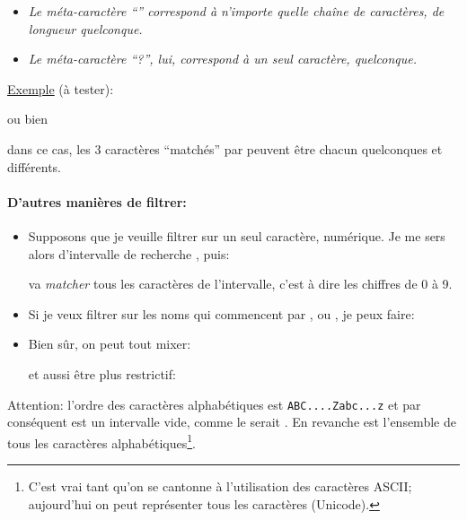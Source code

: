 \begin{center}
  \begin{boxedminipage}{0.75\linewidth}
    \begin{itemize}
    \item \emph{Le méta-caractère ``\ttt{*}'' correspond à n'importe quelle
  chaîne de caractères, de longueur quelconque.} 
    \item \emph{Le méta-caractère ``?'', lui, correspond à un
        seul caractère, quelconque.}
    \end{itemize}
\end{boxedminipage}
\end{center}


\underline{Exemple} (à tester):



ou bien


dans ce cas, les 3 caractères ``matchés'' par  peuvent être
chacun quelconques et différents.

\paragraph{ D'autres manières de filtrer:}
\begin{itemize}
\item Supposons que je veuille filtrer sur un seul caractère, numérique. Je
me sers alors d'intervalle de recherche \ttt{[0-9]}, puis:


\ttt{[0-9]} va \textsl{matcher} tous les caractères de l'intervalle,
c'est à dire les chiffres de 0 à 9. 

\item Si je veux filtrer sur les noms qui commencent par ,
   ou , je peux 
faire:


\item Bien sûr, on peut tout mixer:


et aussi être plus restrictif:

\end{itemize}

Attention: l'ordre des caractères alphabétiques est
\texttt{ABC....Zabc...z} et par 
conséquent \ttt{[a-B]} est un intervalle vide, comme le serait
\ttt{[3-1]}. En revanche \ttt{[A-z]}
est l'ensemble de tous les caractères alphabétiques\footnote{C'est
  vrai tant qu'on se cantonne à l'utilisation des caractères ASCII;
  aujourd'hui on peut représenter \og tous\fg{} les caractères (Unicode).}. 


